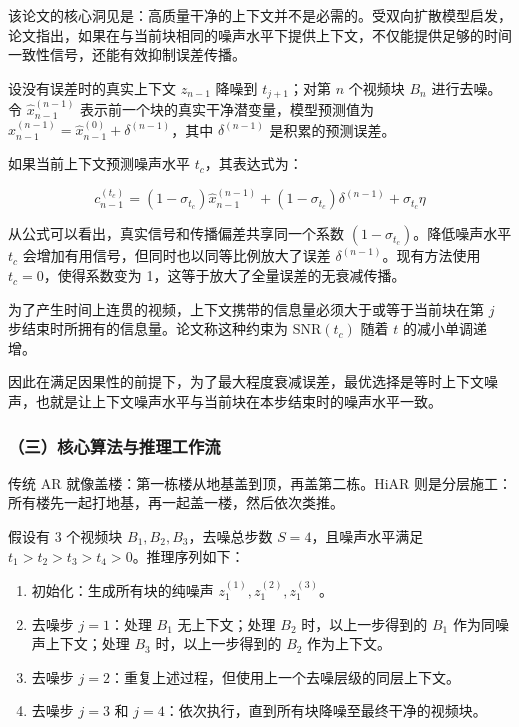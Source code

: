 该论文的核心洞见是：高质量干净的上下文并不是必需的。受双向扩散模型启发，论文指出，如果在与当前块相同的噪声水平下提供上下文，不仅能提供足够的时间一致性信号，还能有效抑制误差传播。

设没有误差时的真实上下文 \(z_{n-1}\) 降噪到 \(t_{j+1}\)；对第 \(n\) 个视频块 \(B_n\) 进行去噪。令 \(\hat{x}_{n-1}^{(n-1)}\) 表示前一个块的真实干净潜变量，模型预测值为 \(\hat{x}_{n-1}^{(n-1)}=\hat{x}_{n-1}^{(0)}+\delta^{(n-1)}\)，其中 \(\delta^{(n-1)}\) 是积累的预测误差。

如果当前上下文预测噪声水平 \(t_c\)，其表达式为：

\[
c_{n-1}^{(t_c)} =
(1-\sigma_{t_c})\hat{x}_{n-1}^{(n-1)} +
(1-\sigma_{t_c})\delta^{(n-1)} +
\sigma_{t_c}\eta
\]

从公式可以看出，真实信号和传播偏差共享同一个系数 \((1-\sigma_{t_c})\)。降低噪声水平 \(t_c\) 会增加有用信号，但同时也以同等比例放大了误差 \(\delta^{(n-1)}\)。现有方法使用 \(t_c=0\)，使得系数变为 1，这等于放大了全量误差的无衰减传播。

为了产生时间上连贯的视频，上下文携带的信息量必须大于或等于当前块在第 \(j\) 步结束时所拥有的信息量。论文称这种约束为 \(\mathrm{SNR}(t_c)\) 随着 \(t\) 的减小单调递增。

因此在满足因果性的前提下，为了最大程度衰减误差，最优选择是等时上下文噪声，也就是让上下文噪声水平与当前块在本步结束时的噪声水平一致。

\hypertarget{ux4e09ux6838ux5fc3ux7b97ux6cd5ux4e0eux63a8ux7406ux5de5ux4f5cux6d41}{%
\subsubsection{（三）核心算法与推理工作流}\label{ux4e09ux6838ux5fc3ux7b97ux6cd5ux4e0eux63a8ux7406ux5de5ux4f5cux6d41}}

传统 AR 就像盖楼：第一栋楼从地基盖到顶，再盖第二栋。HiAR 则是分层施工：所有楼先一起打地基，再一起盖一楼，然后依次类推。

假设有 3 个视频块 \(B_1,B_2,B_3\)，去噪总步数 \(S=4\)，且噪声水平满足 \(t_1\gt t_2\gt t_3\gt t_4\gt 0\)。推理序列如下：

\begin{enumerate}
\def\labelenumi{\arabic{enumi}.}
\tightlist
\item
  初始化：生成所有块的纯噪声 \(z_1^{(1)},z_1^{(2)},z_1^{(3)}\)。
\item
  去噪步 \(j=1\)：处理 \(B_1\) 无上下文；处理 \(B_2\) 时，以上一步得到的 \(B_1\) 作为同噪声上下文；处理 \(B_3\) 时，以上一步得到的 \(B_2\) 作为上下文。
\item
  去噪步 \(j=2\)：重复上述过程，但使用上一个去噪层级的同层上下文。
\item
  去噪步 \(j=3\) 和 \(j=4\)：依次执行，直到所有块降噪至最终干净的视频块。
\end{enumerate}

